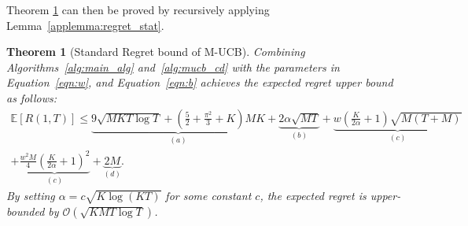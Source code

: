 \documentclass[twoside]{article}
\newcommand{\E}{\mathbb{E}}
\theoremstyle{plain}
\newtheorem{theorem}{Theorem}[section]
\theoremstyle{definition}
\theoremstyle{remark}
\begin{document}
Theorem \ref{appthm:std_regret_mucb} can then be proved by recursively applying Lemma~\ref{applemma:regret_stat}.
\begin{theorem}[Standard Regret bound of M-UCB]\label{appthm:std_regret_mucb}
    Combining Algorithms~\ref{alg:main_alg} and~\ref{alg:mucb_cd} with the parameters in Equation~\ref{eqn:w}, and Equation~\ref{eqn:b} achieves the expected regret upper bound as follows:
    \begin{multline} 
     \E\left[R\left(1,T\right)\right]\leq \underbrace{9\sqrt{MKT\log{T}}+\left(\frac{5}{2}+\frac{\pi^{2}}{3}+K\right)MK}_{(a)}+\underbrace{2\alpha\sqrt{MT}}_{(b)}
    +\underbrace{w\left(\frac{K}{2\alpha}+1\right)\sqrt{M\left(T+M\right)}}_{(c)}\\
    +\underbrace{\frac{w^{2}M}{4}\left(\frac{K}{2\alpha}+1\right)^{2}}_{(c)}+\underbrace{2M}_{(d)}.
    \end{multline}\label{eqn:regret_bound_MUCB_p}
    By setting $\alpha = c\sqrt{K\log{\left(KT\right)}}$ for some constant $c$, the expected regret is upper-bounded by $\mathcal{O}(\sqrt{KMT\log{T}})$.
\end{theorem}
\end{document}
